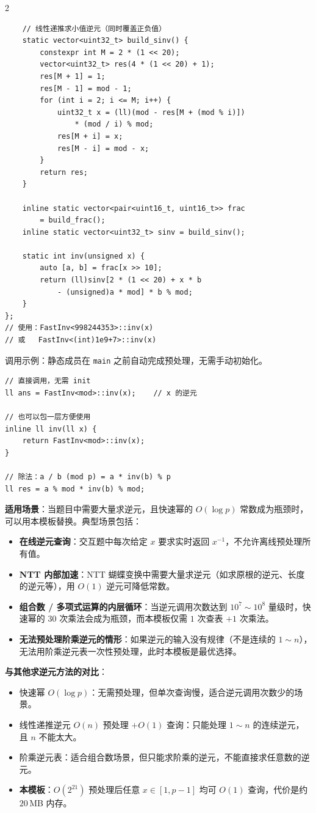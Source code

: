 \begin{multicols*}{2}
\begin{verbatim}
	// 线性递推求小值逆元（同时覆盖正负值）
	static vector<uint32_t> build_sinv() {
		constexpr int M = 2 * (1 << 20);
		vector<uint32_t> res(4 * (1 << 20) + 1);
		res[M + 1] = 1;
		res[M - 1] = mod - 1;
		for (int i = 2; i <= M; i++) {
			uint32_t x = (ll)(mod - res[M + (mod % i)])
				* (mod / i) % mod;
			res[M + i] = x;
			res[M - i] = mod - x;
		}
		return res;
	}

	inline static vector<pair<uint16_t, uint16_t>> frac
		= build_frac();
	inline static vector<uint32_t> sinv = build_sinv();

	static int inv(unsigned x) {
		auto [a, b] = frac[x >> 10];
		return (ll)sinv[2 * (1 << 20) + x * b
			- (unsigned)a * mod] * b % mod;
	}
};
// 使用：FastInv<998244353>::inv(x)
// 或   FastInv<(int)1e9+7>::inv(x)
		\end{verbatim}

		调用示例：静态成员在 \verb|main| 之前自动完成预处理，无需手动初始化。

		\begin{verbatim}
// 直接调用，无需 init
ll ans = FastInv<mod>::inv(x);    // x 的逆元

// 也可以包一层方便使用
inline ll inv(ll x) {
	return FastInv<mod>::inv(x);
}

// 除法：a / b (mod p) = a * inv(b) % p
ll res = a % mod * inv(b) % mod;
		\end{verbatim}

		\textbf{适用场景}：当题目中需要大量求逆元，且快速幂的 $O(\log p)$ 常数成为瓶颈时，可以用本模板替换。典型场景包括：

		\begin{itemize}
			\item \textbf{在线逆元查询}：交互题中每次给定 $x$ 要求实时返回 $x^{-1}$，不允许离线预处理所有值。
			\item \textbf{NTT 内部加速}：NTT 蝴蝶变换中需要大量求逆元（如求原根的逆元、长度的逆元等），用 $O(1)$ 逆元可降低常数。
			\item \textbf{组合数 / 多项式运算的内层循环}：当逆元调用次数达到 $10^7 \sim 10^8$ 量级时，快速幂的 $30$ 次乘法会成为瓶颈，而本模板仅需 $1$ 次查表 $+ 1$ 次乘法。
			\item \textbf{无法预处理阶乘逆元的情形}：如果逆元的输入没有规律（不是连续的 $1 \sim n$），无法用阶乘逆元表一次性预处理，此时本模板是最优选择。
		\end{itemize}

		\textbf{与其他求逆元方法的对比}：

		\begin{itemize}
			\item 快速幂 $O(\log p)$：无需预处理，但单次查询慢，适合逆元调用次数少的场景。
			\item 线性递推逆元 $O(n)$ 预处理 $+ O(1)$ 查询：只能处理 $1 \sim n$ 的连续逆元，且 $n$ 不能太大。
			\item 阶乘逆元表：适合组合数场景，但只能求阶乘的逆元，不能直接求任意数的逆元。
			\item \textbf{本模板}：$O(2^{21})$ 预处理后任意 $x \in [1, p-1]$ 均可 $O(1)$ 查询，代价是约 $20\,$MB 内存。
		\end{itemize}



\end{multicols*}

